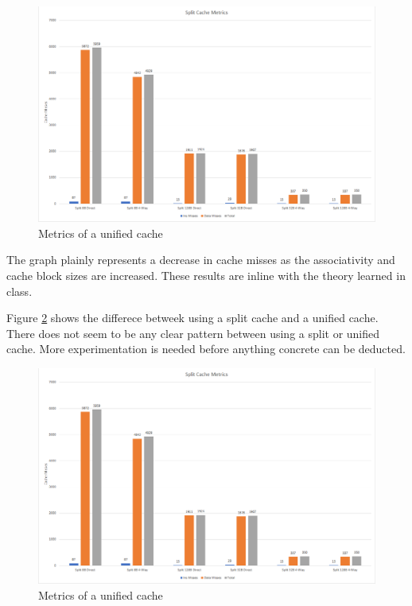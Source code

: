 \documentclass{article}
\begin{document}
		\begin{figure}[H]
			\label{fig:splitMetric}
			\begin{center}
				\includegraphics[width=\textwidth]{spl-cache-metrics.png}
				\caption{Metrics of a unified cache}
			\end{center}
		\end{figure}
		The graph plainly represents a decrease in cache misses as the associativity and cache block sizes are increased. These results are inline with the theory learned in class.
		\par
		Figure \ref{fig:diffMetric} shows the differece betweek using a split cache and a unified cache. There does not seem to be any clear pattern between using a split or unified cache. More experimentation is needed before anything concrete can be deducted.
		\begin{figure}[H]
			\label{fig:diffMetric}
			\begin{center}
				\includegraphics[width=\textwidth]{spl-cache-metrics.png}
				\caption{Metrics of a unified cache}
			\end{center}
		\end{figure}
\end{document}

